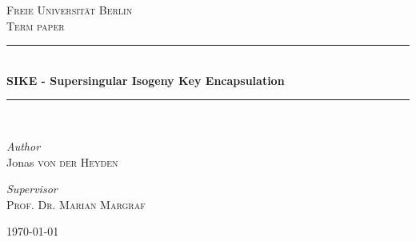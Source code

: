 \documentclass[12pt]{article}
\begin{document}
\makeatletter
\makeatother
\begin{titlepage}  
\center 
\textsc{\LARGE Freie Universität Berlin}\\[1.5cm]
\textsc{\Large Term paper}\\[0.5cm]
\rule{\linewidth}{0.5mm}\\[0.4cm]
{\large\bfseries{} SIKE - Supersingular Isogeny Key Encapsulation}\\[0.4cm]
\rule{\linewidth}{0.5mm}\\[1.5cm]

\begin{minipage}[t]{0.4\textwidth}
	\begin{flushleft}
		\large
		\textit{Author}\\
		Jonas \textsc{von der Heyden}
	\end{flushleft}
\end{minipage}
\begin{minipage}[t]{0.4\textwidth}
	\begin{flushright}
		\large
                \textit{Supervisor}\\
        \textsc{Prof. Dr. Marian Margraf}\\
	\end{flushright}
\end{minipage}  


\vfill\vfill\vfill
{\large\today}

\end{titlepage}

\setcounter{page}{1}
\tableofcontents{}

\newpage

\setcounter{page}{1}


\clearpage


\clearpage


\clearpage


\clearpage



\clearpage

\setcounter{page}{1}
\clearpage

\clearpage

\clearpage
\printbibliography
\end{document}
